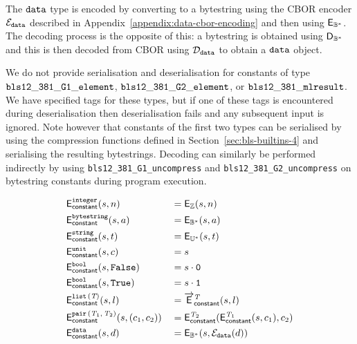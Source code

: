 The $\mathtt{data}$ type is encoded by converting to a bytestring using the CBOR
encoder $\mathcal{E}_{\mathtt{data}}$ described in Appendix~\ref{appendix:data-cbor-encoding} and
then using $\mathsf{E}_{\mathbb{B}^*}$.  The decoding process is the opposite of this: a
bytestring is obtained using $\mathsf{D}_{\mathbb{B}^*}$ and this is then decoded from CBOR
using $\mathcal{D}_{\mathtt{data}}$ to obtain a $\mathtt{data}$ object.

We do not provide serialisation and deserialisation for constants of type
$\mathtt{bls12\_381\_G1\_element}$, $\mathtt{bls12\_381\_G2\_element}$, or
$\mathtt{bls12\_381\_mlresult}$.  We have specified tags for these types, but if one
of these tags is encountered during deserialisation then deserialisation fails
and any subsequent input is ignored.  Note however that constants of the first
two types can be serialised by using the compression functions defined in
Section~\ref{sec:bls-builtins-4} and serialising the resulting bytestrings.
Decoding can similarly be performed indirectly by using
\texttt{bls12\_381\_G1\_uncompress} and \texttt{bls12\_381\_G2\_uncompress} on
bytestring constants during program execution.

\begin{alignat*}{2}
  & \mathsf{E}_{\mathsf{constant}}^{\mathtt{integer}}(s,n)                  &&= \mathsf{E}_{\mathbb{Z}}(s, n) \\
  & \mathsf{E}_{\mathsf{constant}}^{\mathtt{bytestring}}(s,a)               &&= \mathsf{E}_{\mathbb{B}^*}(s, a) \\
  & \mathsf{E}_{\mathsf{constant}}^{\mathtt{string}}(s,t)                   &&= \mathsf{E}_{\mathbb{U}^*}(s, t) \\
  & \mathsf{E}_{\mathsf{constant}}^{\mathtt{unit}}(s,c)                     &&= s  \\
  & \mathsf{E}_{\mathsf{constant}}^{\mathtt{bool}}(s, \texttt{False})       &&= s \cdot \mathtt{0}\\
  & \mathsf{E}_{\mathsf{constant}}^{\mathtt{bool}}(s, \texttt{True})        &&= s \cdot \mathtt{1}\\
  & \mathsf{E}_{\mathsf{constant}}^{\mathtt{list}\,\mathtt{(}\textit{T}\mathtt{)}}(s,l)                  &&= \overrightarrow{\mathsf{E}}^{\textit{T}}_{\mathsf{constant}}(s, l) \\
  & \mathsf{E}_{\mathsf{constant}}^{\mathtt{pair}\,\mathtt{(}\textit{T}_1\mathtt{,}\,\textit{T}_2\mathtt{)}}(s,(c_1,c_2))  &&= \mathsf{E}_{\mathsf{constant}}^{\textit{T}_2}(\mathsf{E}_{\mathsf{constant}}^{\textit{T}_1}(s, c_1), c_2)\\
  & \mathsf{E}_{\mathsf{constant}}^{\mathtt{data}}(s,d)                     &&= \mathsf{E}_{\mathbb{B}^*}(s, \mathcal{E}_{\mathtt{data}}(d))
\end{alignat*}

